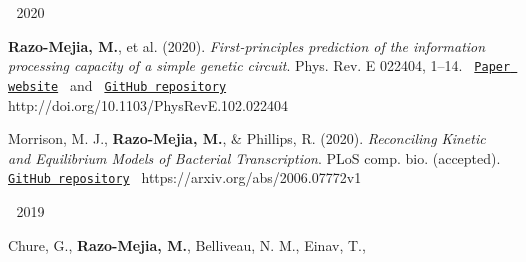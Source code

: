 
\begin{cventries}
  \cventry
    {$\;$}
    {2020}
    {$\;$}
    {$\;$}
    {
      \begin{cvitems} %
          \item {
            \begin{flushleft}
              \textbf{Razo-Mejia, M.}, et al. (2020).
              \textit{First-principles prediction of the information processing
              capacity of a simple genetic circuit}. Phys. Rev. E 022404, 1–14.
              \texttt{
              \href{https://www.rpgroup.caltech.edu/chann_cap/}{Paper website} 
              }
              and
              \texttt{
              \href{https://github.com/RPGroup-PBoC/chann_cap}{GitHub repository}
              }
              \linebreak
              http://doi.org/10.1103/PhysRevE.102.022404
            \end{flushleft}
          }
          \item {
            \begin{flushleft}
              Morrison, M. J., \textbf{Razo-Mejia, M.}, \& Phillips, R. (2020).
              \textit{Reconciling Kinetic and Equilibrium Models of Bacterial
              Transcription}. PLoS comp. bio. (accepted). \texttt{
              \href{https://github.com/RPGroup-PBoC/bursty_transcription}{GitHub repository}
              }
              \linebreak
              https://arxiv.org/abs/2006.07772v1
            \end{flushleft}
          }
      \end{cvitems}
    }
  \cventry
    {$\;$}
    {2019}
    {$\;$}
    {$\;$}
    {
      \begin{cvitems} %
        \item {
        \begin{flushleft}
          Chure, G., \textbf{Razo-Mejia, M.}, Belliveau, N. M., Einav, T.,

\end{flushleft}}
\end{cvitems}}
\end{cventries}
